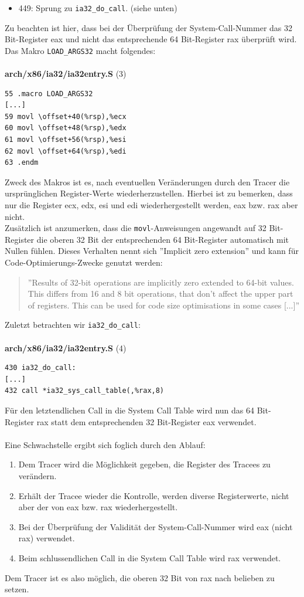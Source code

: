 \documentclass[11pt,a4paper]{article}
\begin{document}
{\begin{itemize}
\item 449: Sprung zu \texttt{ia32\_do\_call}. (siehe unten)
\end{itemize}
Zu beachten ist hier, dass bei der Überprüfung der System-Call-Nummer das 32 Bit-Register eax und nicht das entsprechende 64 Bit-Register rax überprüft wird.\\
Das Makro \texttt{LOAD\_ARGS32} macht folgendes:\\
\\
\textbf{arch/x86/ia32/ia32entry.S} (3)
\begin{lstlisting}[frame=single]
55 .macro LOAD_ARGS32
[...]
59 movl \offset+40(%rsp),%ecx
60 movl \offset+48(%rsp),%edx
61 movl \offset+56(%rsp),%esi
62 movl \offset+64(%rsp),%edi
63 .endm
\end{lstlisting}
Zweck des Makros ist es, nach eventuellen Veränderungen durch den Tracer die ursprünglichen Register-Werte wiederherzustellen. Hierbei ist zu bemerken, dass nur die Register ecx, edx, esi und edi wiederhergestellt werden, eax bzw. rax aber nicht.\\
Zusätzlich ist anzumerken, dass die \texttt{movl}-Anweisungen angewandt auf 32 Bit-Register die oberen 32 Bit der entsprechenden 64 Bit-Register automatisch mit Nullen fühlen. Dieses Verhalten nennt sich ''Implicit zero extension'' und kann für Code-Optimierungs-Zwecke genutzt werden:
\begin{quote}
''Results of 32-bit operations are implicitly zero extended to 64-bit values. This differs from 16 and 8 bit operations, that don't affect the upper part of registers. This can be used for code size optimisations in some cases [...]'' \cite{X860}
\end{quote}
Zuletzt betrachten wir \texttt{ia32\_do\_call}:\\
\\
\textbf{arch/x86/ia32/ia32entry.S} (4)
\begin{lstlisting}[frame=single]
430 ia32_do_call:
[...]
432 call *ia32_sys_call_table(,%rax,8)
\end{lstlisting}
Für den letztendlichen Call in die System Call Table wird nun das 64 Bit-Register rax statt dem entsprechenden 32 Bit-Register eax verwendet.\\
\\
Eine Schwachstelle ergibt sich foglich durch den Ablauf:
\begin{enumerate}
\item Dem Tracer wird die Möglichkeit gegeben, die Register des Tracees zu verändern.
\item Erhält der Tracee wieder die Kontrolle, werden diverse Registerwerte, nicht aber der von eax bzw. rax wiederhergestellt.
\item Bei der Überprüfung der Validität der System-Call-Nummer wird eax (nicht rax) verwendet.
\item Beim schlussendlichen Call in die System Call Table wird rax verwendet.
\end{enumerate}
Dem Tracer ist es also möglich, die oberen 32 Bit von rax nach belieben zu setzen.
}
\end{document}
